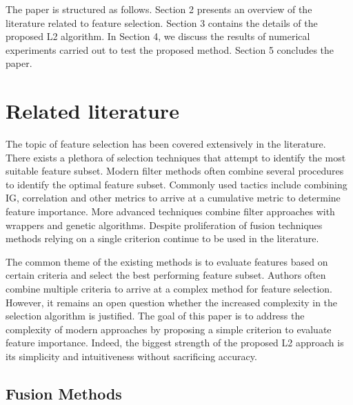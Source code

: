\documentclass[review]{elsarticle}
\begin{document}
The paper is structured as follows. Section 2 presents an overview of the literature related to feature selection. Section 3 contains the details of the proposed L2 algorithm. In Section 4, we discuss the results of numerical experiments carried out to test the proposed method. Section 5 concludes the paper.

\section{Related literature}

The topic of feature selection has been covered extensively in the literature. There exists a plethora of selection techniques that attempt to identify the most suitable feature subset. Modern filter methods often combine several procedures to identify the optimal feature subset. Commonly used tactics include combining IG, correlation and other metrics to arrive at a cumulative metric to determine feature importance.  More advanced techniques combine filter approaches with wrappers and genetic algorithms. Despite proliferation of fusion techniques methods relying on a single criterion continue to be used in the literature. 

The common theme of the existing methods is to evaluate features based on certain criteria and select the best performing feature subset. Authors often combine multiple criteria to arrive at a complex method for feature selection. However, it remains an open question whether the increased complexity in the selection algorithm is justified. The goal of this paper is to address the complexity of modern approaches by proposing a simple criterion to evaluate feature importance. Indeed, the biggest strength of the proposed L2 approach is its simplicity and intuitiveness without sacrificing accuracy.

\subsection{Fusion Methods}
\end{document}
